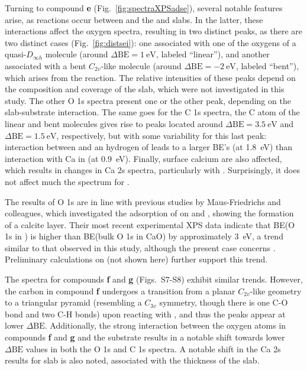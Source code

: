 \documentclass[%
aip,
amsmath,amssymb,
preprint,%
jcp,
showkeys,
]{revtex4-2}
\def\dbe{\ensuremath{\Delta\text{BE}}}
\begin{document}
Turning to compound \textbf{e} (Fig.~\ref{fig:spectraXPSadse}), several notable features arise, as reactions occur between  and the  and  slabs. In the latter, these interactions affect the oxygen spectra, resulting in two distinct peaks, as there are two distinct cases (Fig.~\ref{fig:distsei}): one associated with one of the oxygens of a quasi-$D_{\infty h}$  molecule  (around $\dbe = \SI{1}{\electronvolt}$, labeled ``linear''), and another associated with a bent $C_{2v}$-like  molecule (around $\dbe = \SI{-2}{\electronvolt}$, labeled ``bent''), which arises from the reaction. The relative intensities of these peaks depend on the composition and coverage of the slab, which were not investigated in this study. The other O 1s spectra present one or the other peak, depending on the slab-substrate interaction. The same goes for the C 1s spectra, the C atom of the linear and bent  molecules gives rise to peaks located around $\dbe = \SI{3.5}{\electronvolt}$ and $\dbe = \SI{1.5}{\electronvolt}$, respectively, but with some variability for this last peak: interaction between  and an hydrogen of  leads to a larger BE's (at \SI{1.8}{\electronvolt}) than interaction with Ca in  (at \SI{0.9}{\electronvolt}). Finally, surface calcium are also affected, which results in changes in Ca 2s spectra, particularly with . Surprisingly, it does not affect much the spectrum for .

The results of O 1s are in line with previous studies by Maus-Friedrichs and colleagues\cite{ochsCO2ChemisorptionCa1998,voigtsAdsorptionCO2CO2009,dahleSituPreparationCalcium2012}, which investigated the adsorption of  on  and , showing the formation of a calcite layer. Their most recent experimental XPS data\cite{dahleSituPreparationCalcium2012} indicate that BE(O 1s in ) is higher than BE(bulk O 1s in CaO) by approximately \SI{3}{\electronvolt}, a trend similar to that observed in this study, although the present case concerns . Preliminary calculations on  (not shown here) further support this trend. 

The spectra for compounds \textbf{f} and \textbf{g} (Figs.~S7-S8) exhibit similar trends. However, the carbon in compound \textbf{f} undergoes a transition from a planar $C_{2v}$-like geometry to a triangular pyramid (resembling a $C_{3v}$ symmetry, though there is one C-O bond and two C-H bonds) upon reacting with , and thus the peaks appear at lower \dbe{}. Additionally, the strong interaction between the oxygen atoms in compounds \textbf{f} and \textbf{g} and the  substrate results in a notable shift towards lower \dbe{} values in both the O 1s and C 1s spectra.  A notable shift in the Ca 2s results for  slab is also noted, associated with the thickness of the slab.
\end{document}
